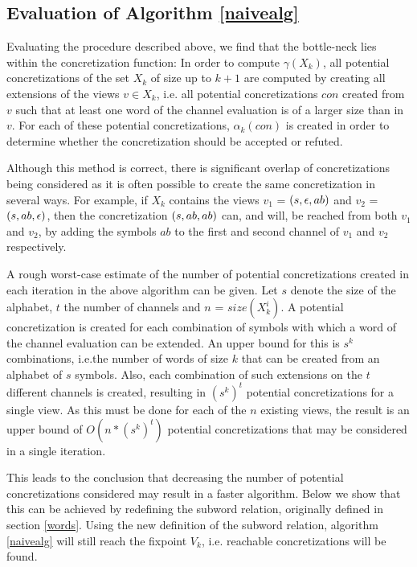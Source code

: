 \subsection{Evaluation of Algorithm \ref{naivealg}}
Evaluating the procedure described above, we find that the bottle-neck lies within the concretization function:
 In order to compute $\gamma(X_k)$, all potential concretizations of the set $X_k$ of size up to $k+1$ are computed by creating all extensions of the views $v \in X_k$, i.e. all potential concretizations $con$ created from $v$ such that at least one word of the channel evaluation is of a larger size than in $v$. For each of these potential concretizations, $\alpha_k(con)$ is created in order to determine whether the concretization should be accepted or refuted.

Although this method is correct, there is significant overlap of concretizations being considered as it is often possible to create the same concretization  in several ways. For example, if $X_k$ contains the views $v_1$ = $(s, \epsilon, ab)$ and $v_2$ = $(s, ab, \epsilon)$, then the concretization $(s, ab,ab)$ can, and will, be reached from both $v_1$ and $v_2$, by adding the symbols $ab$ to the first and second channel of $v_1$ and $v_2$ respectively.

A rough worst-case estimate of the number of potential concretizations created in each iteration in the above algorithm can be given. Let $s$ denote the size of the alphabet, $t$ the number of channels and $n$ = $size(X_k^i)$. A potential concretization is created for each combination of symbols with which a word of the channel evaluation can be extended. An upper bound for this is $s^k$ combinations, i.e.the number of words of size $k$ that can be created from an alphabet of $s$ symbols. Also, each combination of such extensions on the $t$ different channels is created, resulting in $(s^k)^t$ potential concretizations for a single view. As this must be done for each of the $n$ existing views, the result is an upper bound of $O(n*(s^k)^t)$ potential concretizations that may be considered in a single iteration.

This leads to the conclusion that decreasing the number of potential concretizations considered may result in a faster algorithm. Below we show that this can be achieved by redefining the subword relation, originally defined in section \ref{words}. Using the new definition of the subword relation, algorithm \ref{naivealg} will still reach the fixpoint $V_k$, i.e. reachable concretizations will be found.

